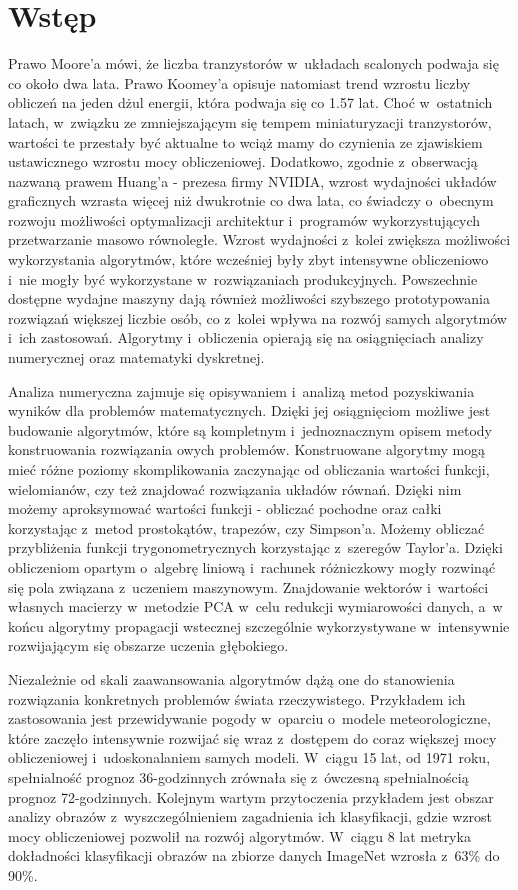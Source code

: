 \chapter{Wstęp}

Prawo Moore'a mówi, że liczba tranzystorów w~układach scalonych podwaja się co około dwa lata. Prawo Koomey'a opisuje natomiast trend wzrostu liczby obliczeń na jeden dżul energii, która podwaja się co 1.57 lat. Choć w~ostatnich latach, w~związku ze zmniejszającym się tempem miniaturyzacji tranzystorów, wartości te przestały być aktualne to wciąż mamy do czynienia ze zjawiskiem ustawicznego wzrostu mocy obliczeniowej. Dodatkowo, zgodnie z~obserwacją nazwaną prawem Huang'a - prezesa firmy NVIDIA, wzrost wydajności układów graficznych wzrasta więcej niż dwukrotnie co dwa lata\cite{tongo}, co świadczy o~obecnym rozwoju możliwości optymalizacji architektur i~programów wykorzystujących przetwarzanie masowo równoległe.  Wzrost wydajności z~kolei zwiększa możliwości wykorzystania algorytmów, które wcześniej były zbyt intensywne obliczeniowo i~nie mogły być wykorzystane w~rozwiązaniach produkcyjnych. Powszechnie dostępne wydajne maszyny dają również możliwości szybszego prototypowania rozwiązań większej liczbie osób, co z~kolei wpływa na rozwój samych algorytmów i~ich zastosowań. Algorytmy i~obliczenia opierają się na osiągnięciach analizy numerycznej oraz matematyki dyskretnej.

Analiza numeryczna zajmuje się opisywaniem i~analizą metod pozyskiwania wyników dla problemów matematycznych. Dzięki jej osiągnięciom możliwe jest budowanie algorytmów, które są kompletnym i~jednoznacznym opisem metody konstruowania rozwiązania owych problemów. Konstruowane algorytmy mogą mieć różne poziomy skomplikowania zaczynając od obliczania wartości funkcji, wielomianów, czy też znajdować rozwiązania układów równań. Dzięki nim możemy aproksymować wartości funkcji - obliczać pochodne oraz całki korzystając z~metod prostokątów, trapezów, czy Simpson'a. Możemy obliczać przybliżenia funkcji trygonometrycznych korzystając z~szeregów Taylor'a. Dzięki obliczeniom opartym o~algebrę liniową i~rachunek różniczkowy mogły rozwinąć się pola związana z~uczeniem maszynowym. Znajdowanie wektorów i~wartości własnych macierzy w~metodzie PCA w~celu redukcji wymiarowości danych, a~w końcu algorytmy propagacji wstecznej szczególnie wykorzystywane w~intensywnie rozwijającym się obszarze uczenia głębokiego\cite{phillips1996theory}.

Niezależnie od skali zaawansowania algorytmów dążą one do stanowienia rozwiązania konkretnych problemów świata rzeczywistego. Przykładem ich zastosowania jest przewidywanie pogody w~oparciu o~modele meteorologiczne, które zaczęło intensywnie rozwijać się wraz z~dostępem do coraz większej mocy obliczeniowej i~udoskonalaniem samych modeli. W~ciągu 15 lat, od 1971 roku, spełnialność prognoz 36-godzinnych zrównała się z~ówczesną spełnialnością prognoz 72-godzinnych\cite{lynch2008origins}. Kolejnym wartym przytoczenia przykładem jest obszar analizy obrazów z~wyszczególnieniem zagadnienia ich klasyfikacji, gdzie wzrost mocy obliczeniowej pozwolił na rozwój algorytmów. W~ciągu 8 lat metryka dokładności klasyfikacji obrazów na zbiorze danych ImageNet wzrosła z~63\% do 90\%\cite{lynch2008origins,dai2021coatnet}.

